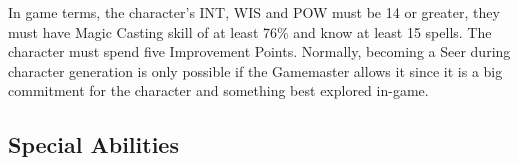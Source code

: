 In game terms, the character's INT, WIS and POW must be 14 or greater, they must have Magic Casting skill of at least 76\% and know at least 15 spells. The character must spend five Improvement Points. Normally, becoming a Seer during character generation is only possible if the Gamemaster allows it since it is a big commitment for the character and something best explored in-game.

\subsection{Special Abilities}


